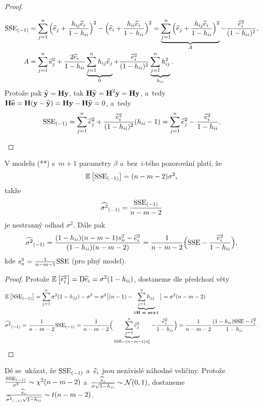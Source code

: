\begin{theorem}
\begin{proof}
\begin{enumerate}[1)]
		\[
	\begin{split}
	{\mathrm{SSE}_{(-1)}}& = \sum\limits_{j=1}^{n} \Big(\widehat{e}_j+\frac{h_{ij}\widehat{e}_i}{1-h_{ii}}\Big)^2-\Big(\widehat{e}_i+\frac{h_{ii}\widehat{e}_i}{1-h_{ii}}\Big)^2 = \underbrace{\sum\limits_{j=1}^{n}\Big(\widehat{e}_j+\frac{h_{ij}\widehat{e}_i}{1-h_{ii}}\Big)^2}_A-\frac{\widehat{e}_i^2}{(1-h_{ii})^2},\\
	A& = \sum\limits_{j=1}^{n} \widehat{e}_j^2+\frac{2\widehat{e}_i}{1-h_{ii}}\underbrace{\sum\limits_{j=1}^{n} h_{ij}\widehat{e}_j}_0+\frac{\widehat{e}_i^2}{(1-h_{ii})^2}\underbrace{\sum\limits_{j=1}^{n} h_{ij}^2}_{h_{ii}}.
	\end{split}
	\]
		Protože pak $\widehat{\textbf{y}} = \textbf{H}\textbf{y}$, tak $\textbf{H}\widehat{\textbf{y}} = \textbf{H}^2\textbf{y} = \textbf{H}\textbf{y}$, a~tedy $\textbf{H}\widehat{\textbf{e}} = \textbf{H}(\textbf{y}-\widehat{\textbf{y}}) = \textbf{H}\textbf{y}-\textbf{H}\widehat{\textbf{y}} = 0$, a~tedy
		 $$ {\mathrm{SSE}_{(-1)}} = \sum\limits_{j=1}^{n}\widehat{e}_j^2+\frac{\widehat{e}_i^2}{(1-h_{ii})^2}(h_{ii}-1) = \sum\limits_{j=1}^{n}\widehat{e}_j^2-\frac{\widehat{e}_i^2}{1-h_{ii}}. $$
	\end{enumerate}
\end{proof}
\end{theorem}

\begin{dusl}
	V modelu (**) s~$m+1$ parametry $\beta$ a~bez~$i$-tého pozorování platí, že $$ \mathbb{E}\left[ {\mathrm{SSE}_{(-1)}} \right] = (n-m-2)\sigma^2, $$
	takže
	 $$ {\widehat{{\sigma}^2}_{(-1)}} = \frac{{\mathrm{SSE}_{(-1)}}}{n-m-2} $$ je nestranný odhad $\sigma^2$. Dále pak
	 $$ {\widehat{{\sigma}^2}_{(-1)}} = \frac{(1-h_{ii})(n-m-1)s_n^2-\widehat{e}_i^2}{(1-h_{ii})(n-m-2)} = \frac{1}{n-m-2}\Big(\mathrm{SSE} -\frac{\widehat{e}_i^2}{1-h_{ii}}\Big), $$ kde $s_n^2 = \frac{1}{n-m-1}\mathrm{SSE}$ (pro plný model).
	\begin{proof}
		Protože $\mathbb{E}\left[ \widehat{e}_i^2 \right] = \mathrm{D} \widehat{e}_i = \sigma^2(1-h_{ii})$, dostaneme dle předchozí věty
		\[
		\begin{split}
		&\mathbb{E}\left[ {\mathrm{SSE}_{(-1)}} \right] = \sum\limits_{j=1}^{n}\sigma^2(1-h_{jj})-\sigma^2 = \sigma^2\big[(n-1)-\underbrace{\sum\limits_{j=1}^{n} h_{jj}}_{h\textbf{H = m+1}}\big] = \sigma^2(n-m-2)\\
		&{\widehat{{\sigma}^2}_{(-1)}} = \frac{1}{n-m-2}{\mathrm{SSE}_{(-1)}} = \frac{1}{n-m-2}\Big(\underbrace{\sum\limits_{j=1}^{n}\widehat{e}_j^2}_{\mathrm{SSE} = (n-m-1)s_n^2}-\frac{\widehat{e}_i^2}{1-h_{ii}}\Big) = \frac{1}{n-m-2}\frac{(1-h_{ii})\mathrm{SSE}-\widehat{e}_i^2}{1-h_{ii}}.
		\end{split}
		\]
	\end{proof}
\end{dusl}

\begin{remark}
	Dě se~ukázat, že ${\mathrm{SSE}_{(-1)}}$ a~$\widehat{e}_i$ jsou nezávislé náhodné veličiny. Protože $\frac{{\mathrm{SSE}_{(-1)}}}{\sigma^2}\sim\chi^2(n-m-2)$ a~$\frac{\widehat{e}_i}{\sigma\sqrt{1-h_{ii}}}\sim\mathcal{N}(0,1)$, dostaneme $\frac{\widehat{e}_i}{{\widehat{{\sigma}^2}_{(-1)}}\sqrt{1-h_{ii}}}\sim t(n-m-2)$.
\end{remark}

